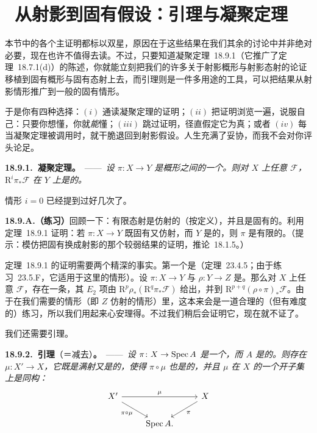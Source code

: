 
\section{\hard\ 从射影到固有假设：\trChow{}引理与\trGrothendieck{}凝聚定理}

本节中的各个主证明都标以双星，原因在于这些结果在我们其余的讨论中并非绝对必要，现在也许不值得去读。不过，只要知道\mbox{\trGrothendieck{}凝聚定理~18.9.1}（它推广了\mbox{定理~18.7.1(d)}）的陈述，你就能立刻把我们的许多关于射影概形与射影态射的论证移植到固有概形与固有态射上去，而\trChow{}引理则是一件多用途的工具，可以把结果从射影情形推广到一般的固有情形。

于是你有四种选择：$(i)$ 通读\trGrothendieck{}凝聚定理的证明；$(ii)$ 把证明浏览一遍，说服自己：只要你想懂，你就\emph{能}懂；$(iii)$ 跳过证明，径直假定它为真；或者 $(iv)$ 每当\trGrothendieck{}凝聚定理被调用时，就干脆退回到射影假设。人生充满了妥协，而我不会对你评头论足。

\textbf{18.9.1.\ \trGrothendieck{}凝聚定理}\textbf{。}\ ——\ \emph{设 $\pi\colon X\to Y$ 是\trLocally\trNoetherian{}概形之间的一个\trProper\trMorphism。则对 $X$ 上任意\trCoherentSheaf{} $\mathscr{F}$，$\mathrm{R}^i\pi_*\mathscr{F}$ 在 $Y$ 上是\trCoh{}的。}

情形 $i=0$ 已经提到过好几次了。

\textbf{18.9.A.（练习）}\quad 回顾一下：有限态射是仿射的（按定义），并且是固有的。利用\mbox{定理~18.9.1} 证明：若 $\pi\colon X\to Y$ 既固有又仿射，而 $Y$ 是\trNoetherian{}的，则 $\pi$ 是有限的。（提示：模仿把固有换成射影的那个较弱结果的证明，\mbox{推论~18.1.5}。）

\mbox{定理~18.9.1} 的证明需要两个精深的事实。第一个是\trLeray\trSpectralSequence（\mbox{定理~23.4.5}；由于\mbox{练习~23.5.F}，它适用于这里的情形）。设 $\pi\colon X\to Y$ 与 $\rho\colon Y\to Z$ 是\trQuasicompact\trSeparated\trMorphism。那么对 $X$ 上任意\trQCSheaf{} $\mathscr{F}$，存在一条\trSpectralSequence，其 $E_2$ 项由 $\mathrm{R}^p\rho_*(\mathrm{R}^q\pi_*\mathscr{F})$ 给出，并\trConverge{}到 $\mathrm{R}^{p+q}(\rho\circ\pi)_*\mathscr{F}$。由于在我们需要的情形（即 $Z$ 仿射的情形）里，这本来会是一道合理的（但有难度的）练习，所以我们用起来心安理得。不过我们稍后会证明它，现在就不证了。

我们还需要\trChow{}引理。

\textbf{18.9.2.\ \trChow{}引理}（\trProper{}＝\trProjective{}减去\trBirational\trProjective）\textbf{。}\ ——\ \emph{设 $\pi\colon X\to\operatorname{Spec} A$ 是一个\trProper\trMorphism，而 $A$ 是\trNoetherian{}的。则存在 $\mu\colon X'\to X$，它既是满射又是\trProjective{}的，使得 $\pi\circ\mu$ 也是\trProjective{}的，并且 $\mu$ 在 $X$ 的一个\trDense{}开子集上是同构：}
\[
\begin{tikzcd}
X' \ar[rr, "\mu"] \ar[dr, "\pi\circ\mu"'] && X \ar[dl, "\pi"] \\
& \Spec A. &
\end{tikzcd}
\]

